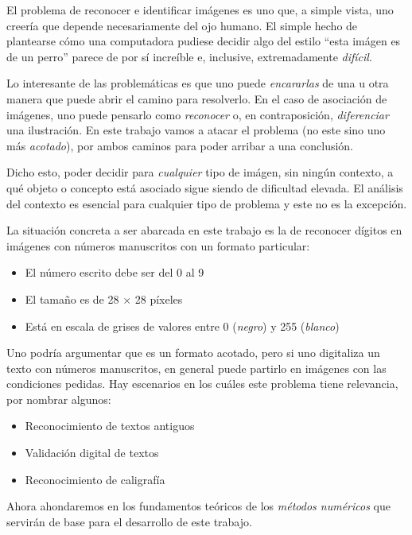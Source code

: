 El problema de reconocer e identificar im\'agenes es uno que, a simple vista, uno creer\'ia que depende necesariamente del ojo humano. El simple hecho de plantearse c\'omo una computadora pudiese decidir algo del estilo ``esta im\'agen es de un perro'' parece de por s\'i incre\'ible e, inclusive, extremadamente \textit{dif\'icil}.

Lo interesante de las problem\'aticas es que uno puede \textit{encararlas} de una u otra manera que puede abrir el camino para resolverlo. En el caso de asociaci\'on de im\'agenes, uno puede pensarlo como \textit{reconocer} o, en contraposici\'on, \textit{diferenciar} una ilustraci\'on. En este trabajo vamos a atacar el problema (no este sino uno m\'as \textit{acotado}), por ambos caminos para poder arribar a una conclusi\'on.

Dicho esto, poder decidir para \textit{cualquier} tipo de im\'agen, sin ning\'un contexto, a qu\'e objeto o concepto est\'a asociado sigue siendo de dificultad elevada. El an\'alisis del contexto es esencial para cualquier tipo de problema y este no es la excepci\'on.

La situaci\'on concreta a ser abarcada en este trabajo es la de reconocer d\'igitos en im\'agenes con n\'umeros manuscritos con un formato particular:

\begin{itemize}
\item El n\'umero escrito debe ser del 0 al 9
\item El tamaño es de 28 $\times$ 28 p\'ixeles
\item Est\'a en escala de grises de valores entre 0 (\textit{negro}) y 255 (\textit{blanco})
\end{itemize}

Uno podr\'ia argumentar que es un formato acotado, pero si uno digitaliza un texto con n\'umeros manuscritos, en general puede partirlo en im\'agenes con las condiciones pedidas. Hay escenarios en los cu\'ales este problema tiene relevancia, por nombrar algunos:

\begin{itemize}
\item Reconocimiento de textos antiguos
\item Validaci\'on digital de textos
\item Reconocimiento de caligraf\'ia
\end{itemize}

Ahora ahondaremos en los fundamentos te\'oricos de los \textit{m\'etodos num\'ericos} que servir\'an de base para el desarrollo de este trabajo.

